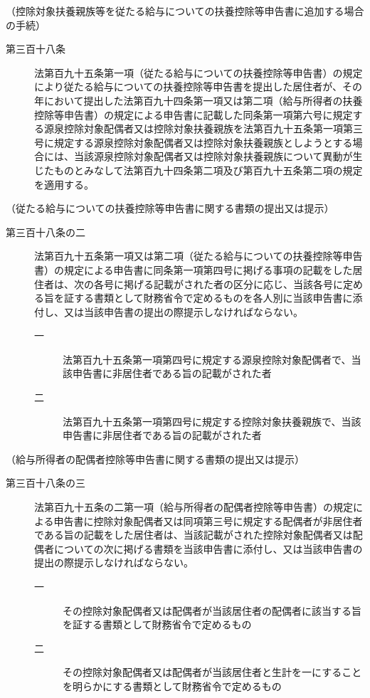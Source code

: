 \documentclass[twocolumn,a4j,10pt]{ltjtarticle}
\begin{document}
\noindent\hspace{10pt}（控除対象扶養親族等を従たる給与についての扶養控除等申告書に追加する場合の手続）
\begin{description}
\item[第三百十八条]法第百九十五条第一項（従たる給与についての扶養控除等申告書）の規定により従たる給与についての扶養控除等申告書を提出した居住者が、その年において提出した法第百九十四条第一項又は第二項（給与所得者の扶養控除等申告書）の規定による申告書に記載した同条第一項第六号に規定する源泉控除対象配偶者又は控除対象扶養親族を法第百九十五条第一項第三号に規定する源泉控除対象配偶者又は控除対象扶養親族としようとする場合には、当該源泉控除対象配偶者又は控除対象扶養親族について異動が生じたものとみなして法第百九十四条第二項及び第百九十五条第二項の規定を適用する。
\end{description}
\noindent\hspace{10pt}（従たる給与についての扶養控除等申告書に関する書類の提出又は提示）
\begin{description}
\item[第三百十八条の二]法第百九十五条第一項又は第二項（従たる給与についての扶養控除等申告書）の規定による申告書に同条第一項第四号に掲げる事項の記載をした居住者は、次の各号に掲げる記載がされた者の区分に応じ、当該各号に定める旨を証する書類として財務省令で定めるものを各人別に当該申告書に添付し、又は当該申告書の提出の際提示しなければならない。
\begin{description}
\item[一]法第百九十五条第一項第四号に規定する源泉控除対象配偶者で、当該申告書に非居住者である旨の記載がされた者
\item[二]法第百九十五条第一項第四号に規定する控除対象扶養親族で、当該申告書に非居住者である旨の記載がされた者
\end{description}
\end{description}
\noindent\hspace{10pt}（給与所得者の配偶者控除等申告書に関する書類の提出又は提示）
\begin{description}
\item[第三百十八条の三]法第百九十五条の二第一項（給与所得者の配偶者控除等申告書）の規定による申告書に控除対象配偶者又は同項第三号に規定する配偶者が非居住者である旨の記載をした居住者は、当該記載がされた控除対象配偶者又は配偶者についての次に掲げる書類を当該申告書に添付し、又は当該申告書の提出の際提示しなければならない。
\begin{description}
\item[一]その控除対象配偶者又は配偶者が当該居住者の配偶者に該当する旨を証する書類として財務省令で定めるもの
\item[二]その控除対象配偶者又は配偶者が当該居住者と生計を一にすることを明らかにする書類として財務省令で定めるもの
\end{description}
\end{description}
\end{document}
